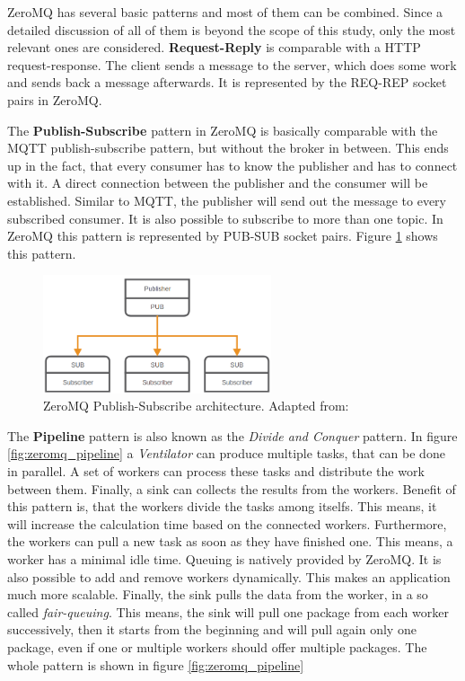 ZeroMQ has several basic patterns and most of them can be combined.
Since a detailed discussion of all of them is beyond the scope of this study, only the most relevant ones are considered.\newline
\textbf{Request-Reply} is comparable with a \ac{HTTP} request-response.
The client sends a message to the server, which does some work and sends back a message afterwards.
It is represented by the REQ-REP socket pairs in ZeroMQ.\newline

The \textbf{Publish-Subscribe} pattern in ZeroMQ is basically comparable with the MQTT publish-subscribe pattern, but without the broker in between.
This ends up in the fact, that every consumer has to know the publisher and has to connect with it.
A direct connection between the publisher and the consumer will be established.
Similar to MQTT, the publisher will send out the message to every subscribed consumer.
It is also possible to subscribe to more than one topic.
In ZeroMQ this pattern is represented by PUB-SUB socket pairs.
Figure \ref{fig:zeromq_pub_sub} shows this pattern.

\begin{figure}[H]
    \centering
    \includegraphics[width=0.6\textwidth]{resources/images/zeromq-pub-sub.png}
    \caption[ZeroMQ Publish-Subscribe architecture]{ZeroMQ Publish-Subscribe architecture. Adapted from: \autocite{ZeroMQ:Guide}}
    \label{fig:zeromq_pub_sub}
\end{figure}

The \textbf{Pipeline} pattern is also known as the \textit{Divide and Conquer} pattern.
In figure \ref{fig:zeromq_pipeline} a \textit{Ventilator} can produce multiple tasks, that can be done in parallel.\autocite[cf.]{ZeroMQ:Guide}
A set of workers can process these tasks and distribute the work between them.\autocite[cf.]{ZeroMQ:Guide}
Finally, a sink can collects the results from the workers.\autocite[cf.]{ZeroMQ:Guide}
Benefit of this pattern is, that the workers divide the tasks among itselfs.
This means, it will increase the calculation time based on the connected workers.
Furthermore, the workers can pull a new task as soon as they have finished one.
This means, a worker has a minimal idle time.
Queuing is natively provided by ZeroMQ.
It is also possible to add and remove workers dynamically.
This makes an application much more scalable.
Finally, the sink pulls the data from the worker, in a so called \textit{fair-queuing}.
This means, the sink will pull one package from each worker successively, then it starts from the beginning and will pull again only one package, even if one or multiple workers should offer multiple packages.
The whole pattern is shown in figure \ref{fig:zeromq_pipeline}\newline

